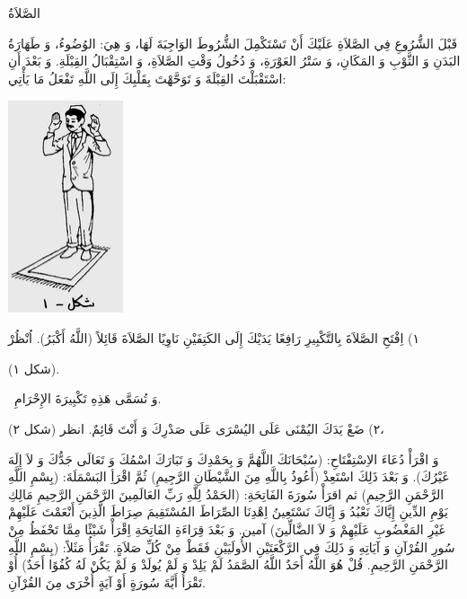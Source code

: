 \documentclass[a5paper]{article}
\begin{document}
الصَّلاَةُ

قَبْلَ الشُّرُوعِ فِي الصَّلاَةِ عَلَيْكَ أَنْ تَسْتَكْمِلَ الشُّرُوطَ الوَاجِبَةَ لَهَا، وَ هِيَ: الوُضُوءُ، وَ طَهَارَةُ البَدَنِ وَ الثَّوْبِ وَ المَكَانِ، وَ سَتْرُ العَوْرَةِ، وَ دُخُولُ وَقْتِ الصَّلاَةِ، وَ اسْتِقْبَالُ القِبْلَةِ. وَ بَعْدَ أَنِ اسْتَقْبَلْتَ القِبْلَةَ وَ تَوَحَّهْتَ بِقَلْبِكَ إِلَى اللَّهِ تَفْعَلُ مَا يَأْتِي:

\begin{center}
\includegraphics[width=1.3299in,height=2.4717in]{images/MuhammadBagauddinprettified-img345.png}
\end{center}
١) اِفْتَحِ الصَّلاَةَ بِالتَّكْبِيرِ رَافِعًا يَدَيْكَ إِلَى الكَتِفَيْنِ نَاوِيًا الصَّلاَةَ قَائِلاً (اللَّهُ أَكْبَرُ). اُنْظُرْ 

(شكل ١).

\ وَ تُسَمَّى هَذِهِ تَكْبِيرَةَ الإِحْرَامِ. 

٢) ضَعْ يَدَكَ اليُمْنَى عَلَى اليُسْرَى عَلَى صَدْرِكَ وَ أَنْتَ قَائِمٌ. انظر (شكل ٢)،

وَ اقْرَأْ دُعَاءَ الاِسْتِفْتَاحِ: (سُبْحَانَكَ اللَّهُمَّ وَ بِحَمْدِكَ وَ تَبَارَكَ اسْمُكَ وَ تَعَالَى جَدُّكَ وَ لاَ إِلَهَ غَيْرُكَ). وَ بَعْدَ ذَلِكَ اسْتَعِذْ (أَعُوذُ بِاللَّهِ مِنَ الشَّيْطَانِ الرَّجِيمِ) ثُمَّ اقْرَأِ البَسْمَلَةَ: (بِسْمِ اللَّهِ الرَّحْمَنِ الرَّحِيمِ) ثم اقرَأْ سُورَةَ الفَاتِحَةِ: (الحَمْدُ لِلَّهِ رَبِّ العَالَمِينَ الرَّحْمَنِ الرَّحِيمِ مَالِكِ يَوْمِ الدِّينِ إِيَّاكَ نَعْبُدُ وَ إِيَّاكَ نَسْتَعِينُ اِهْدِنَا الصِّرَاطَ المُسْتَقِيمَ صِرَاطَ الَّذِينَ أَنْعَمْتَ عَلَيْهِمْ غَيْرِ المَغْضُوبِ عَلَيْهِمْ وَ لاَ الضَّالِّينَ) آمين. وَ بَعْدَ قِرَاءَةِ الفَاتِحَةِ اِقْرَأْ شَيْئًا مِمَّا تَحْفَظُ مِنْ سُورِ القُرْآنِ وَ آيَاتِهِ وَ ذَلِكَ فِي الرَّكْعَتَيْنِ الأُولَيَيْنِ فَقَطْ مِنْ كُلِّ صَلاَةٍ. تَقْرَأُ مَثَلاً: (بِسْمِ اللَّهِ الرَّحْمَنِ الرَّحِيمِ. قُلْ هُوَ اللَّهُ أَحَدٌ اللَّهُ الصَّمَدُ لَمْ يَلِدْ وَ لَمْ يُولَدْ وَ لَمْ يَكُنْ لَهُ كُفُوًا أَحَدٌ) أُوْ تَقْرَأُ أَيَّةَ سُورَةٍ أَوْ آيَةٍ أُخْرَى مِنَ القُرْآنِ.
\end{document}
